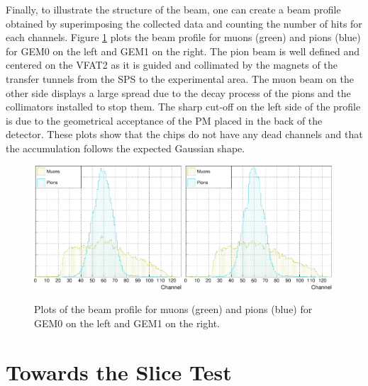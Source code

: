       Finally, to illustrate the structure of the beam, one can create a beam profile obtained by superimposing the collected data and counting the number of hits for each channels. Figure \ref{fig:II-3-data-beam-profile} plots the beam profile for muons (green) and pions (blue) for GEM0 on the left and GEM1 on the right. The pion beam is well defined and centered on the VFAT2 as it is guided and collimated by the magnets of the transfer tunnels from the SPS to the experimental area. The muon beam on the other side displays a large spread due to the decay process of the pions and the collimators installed to stop them. The sharp cut-off on the left side of the profile is due to the geometrical acceptance of the PM placed in the back of the detector. These plots show that the chips do not have any dead channels and that the accumulation follows the expected Gaussian shape.

      \begin{figure}[h!]
        \centering
        \includegraphics[width=0.49\textwidth]{img/plots/cBeamProfile_GEM0-crop}
        \includegraphics[width=0.49\textwidth]{img/plots/cBeamProfile_GEM1-crop}
        \caption{Plots of the beam profile for muons (green) and pions (blue) for GEM0 on the left and GEM1 on the right.}
        \label{fig:II-3-data-beam-profile}
      \end{figure}

  \section{Towards the Slice Test}


